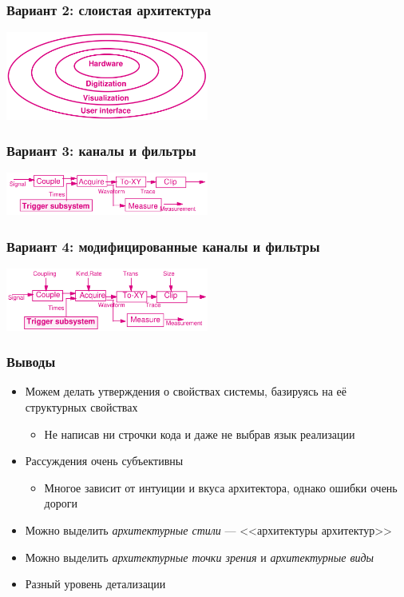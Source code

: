 \documentclass[xetex,mathserif,serif]{beamer}
\begin{document}
	\begin{frame}
		\frametitle{Вариант 2: слоистая архитектура}
		\begin{center}
			\includegraphics[width=0.5\textwidth]{oscilloscopeLayers.png}
		\end{center}
	\end{frame}

	\begin{frame}
		\frametitle{Вариант 3: каналы и фильтры}
		\begin{center}
			\includegraphics[width=0.5\textwidth]{oscilloscopeFilters.png}
		\end{center}
	\end{frame}

	\begin{frame}
		\frametitle{Вариант 4: модифицированные каналы и фильтры}
		\begin{center}
			\includegraphics[width=0.5\textwidth]{oscilloscopeModifiedFilters.png}
		\end{center}
	\end{frame}

	\begin{frame}
		\frametitle{Выводы}
		\begin{itemize}
			\item Можем делать утверждения о свойствах системы, базируясь на её структурных свойствах
			\begin{itemize}
				\item Не написав ни строчки кода и даже не выбрав язык реализации
			\end{itemize}
			\item Рассуждения очень субъективны
			\begin{itemize}
				\item Многое зависит от интуиции и вкуса архитектора, однако ошибки очень дороги
			\end{itemize}
			\item Можно выделить \emph{архитектурные стили} --- <<архитектуры архитектур>>
			\item Можно выделить \emph{архитектурные точки зрения} и \emph{архитектурные виды}
			\item Разный уровень детализации
		\end{itemize}
	\end{frame}
\end{document}
